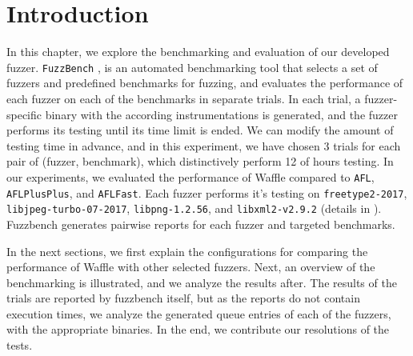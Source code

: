 \section{Introduction}
\label{sec:ch4-intro}


In this chapter, we explore the benchmarking and evaluation of our developed fuzzer. \texttt{FuzzBench} \cite{metzman2020fuzzbench}, is an automated benchmarking tool that selects a set of fuzzers and predefined benchmarks for fuzzing, and evaluates the performance of each fuzzer on each of the benchmarks in separate trials. In each trial, a fuzzer-specific binary with the according instrumentations is generated, and the fuzzer performs its testing until its time limit is ended. We can modify the amount of testing time in advance, and in this experiment, we have chosen 3 trials for each pair of (fuzzer, benchmark), which distinctively perform 12 of hours testing. In our experiments, we evaluated the performance of Waffle compared to \texttt{AFL}, \texttt{AFLPlusPlus}, and \texttt{AFLFast}. Each fuzzer performs it's testing on \texttt{freetype2-2017}, \texttt{libjpeg-turbo-07-2017}, \texttt{libpng-1.2.56}, and \texttt{libxml2-v2.9.2} (details in \cite{fuzzbench_benchmarks}). Fuzzbench generates pairwise reports for each fuzzer and targeted benchmarks.

In the next sections, we first explain the configurations for comparing the performance of Waffle with other selected fuzzers. Next, an overview of the benchmarking is illustrated, and we analyze the results after. The results of the trials are reported by fuzzbench itself, but as the reports do not contain execution times, we analyze the generated queue entries of each of the fuzzers, with the appropriate binaries. In the end, we contribute our resolutions of the tests.